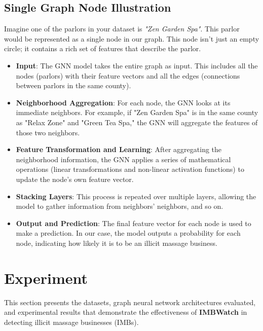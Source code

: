 \documentclass[letterpaper]{article} %
\begin{document}
\subsection{Single Graph Node Illustration}

Imagine one of the parlors in your dataset is \textit{"Zen Garden Spa"}. This parlor would be represented as a single node in our graph. This node isn't just an empty circle; it contains a rich set of features that describe the parlor.

\begin{itemize}
    \item \textbf{Input}: The GNN model takes the entire graph as input. This includes all the nodes (parlors) with their feature vectors and all the edges (connections between parlors in the same county).
    \item \textbf{Neighborhood Aggregation}: For each node, the GNN looks at its immediate neighbors. For example, if "Zen Garden Spa" is in the same county as "Relax Zone" and "Green Tea Spa," the GNN will aggregate the features of those two neighbors.
    \item \textbf{Feature Transformation and Learning}: After aggregating the neighborhood information, the GNN applies a series of mathematical operations (linear transformations and non-linear activation functions) to update the node's own feature vector.
    \item \textbf{Stacking Layers}: This process is repeated over multiple layers, allowing the model to gather information from neighbors' neighbors, and so on.
    \item \textbf{Output and Prediction}: The final feature vector for each node is used to make a prediction. In our case, the model outputs a probability for each node, indicating how likely it is to be an illicit massage business.
\end{itemize}


  




\section{Experiment}
This section presents the datasets, graph neural network architectures evaluated, and experimental results that demonstrate the effectiveness of \textbf{IMBWatch} in detecting illicit massage businesses (IMBs).

\end{document}
